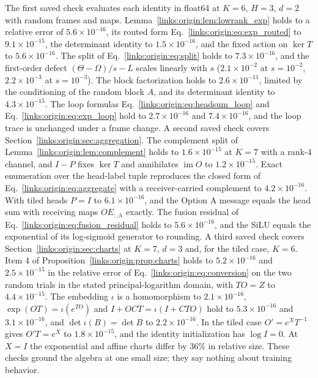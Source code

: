 \documentclass[11pt]{article}
\theoremstyle{definition}
\theoremstyle{remark}
\providecommand{\im}{\operatorname{im}}
\begin{document}
The first saved check evaluates each identity in float64 at $K=6$, $H=3$, $d=2$ with random frames and maps. Lemma~\ref{links:origin:lem:lowrank_exp} holds to a relative error of $5.6\times10^{-16}$, its routed form Eq.~\eqref{links:origin:eq:exp_routed} to $9.1\times10^{-15}$, the determinant identity to $1.5\times10^{-16}$, and the fixed action on $\ker T$ to $5.6\times10^{-16}$. The split of Eq.~\eqref{links:origin:eq:split} holds to $7.3\times10^{-16}$, and the first-order defect $(\Theta-\Omega)/s-L$ scales linearly with $s$ ($2.1\times10^{-2}$ at $s=10^{-2}$, $2.2\times10^{-3}$ at $s=10^{-3}$). The block factorization holds to $2.6\times10^{-11}$, limited by the conditioning of the random block $A$, and its determinant identity to $4.3\times10^{-15}$. The loop formulas Eq.~\eqref{links:origin:eq:headsum_loop} and Eq.~\eqref{links:origin:eq:exp_loop} hold to $2.7\times10^{-16}$ and $7.4\times10^{-16}$, and the loop trace is unchanged under a frame change. A second saved check covers Section~\ref{links:origin:sec:aggregation}. The complement split of Lemma~\ref{links:origin:lem:complement} holds to $1.6\times10^{-15}$ at $K=7$ with a rank-4 channel, and $I-P$ fixes $\ker T$ and annihilates $\im O$ to $1.2\times10^{-15}$. Exact enumeration over the head-label tuple reproduces the closed form of Eq.~\eqref{links:origin:eq:aggregate} with a receiver-carried complement to $4.2\times10^{-16}$. With tiled heads $P=I$ to $6.1\times10^{-16}$, and the Option A message equals the head sum with receiving maps $OE_{:,h}$ exactly. The fusion residual of Eq.~\eqref{links:origin:eq:fusion_residual} holds to $5.6\times10^{-16}$, and the SiLU equals the exponential of its log-sigmoid generator to rounding. A third saved check covers Section~\ref{links:origin:sec:charts} at $K=7$, $d=3$ and, for the tiled case, $K=6$. Item 4 of Proposition~\ref{links:origin:prop:charts} holds to $5.2\times10^{-16}$ and $2.5\times10^{-15}$ in the relative error of Eq.~\eqref{links:origin:eq:conversion} on the two random trials in the stated principal-logarithm domain, with $TO=Z$ to $4.4\times10^{-15}$. The embedding $\iota$ is a homomorphism to $2.1\times10^{-16}$, $\exp(OT)=\iota(e^{TO})$ and $I+OCT=\iota(I+CTO)$ hold to $5.3\times10^{-16}$ and $3.1\times10^{-16}$, and $\det\iota(B)=\det B$ to $2.2\times10^{-16}$. In the tiled case $O'=e^{X}T^{-1}$ gives $O'T=e^{X}$ to $1.8\times10^{-15}$, and the identity initialization has $\log I=0$. At $X=I$ the exponential and affine charts differ by $36\%$ in relative size. These checks ground the algebra at one small size; they say nothing about training behavior.
\end{document}
